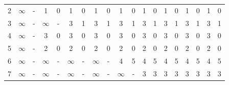 \documentclass[12pt, a4paper]{report}
\newtheorem[style=M,bodystyle=\normalfont]{theorem}{Theorem}
\newtheorem[style=M,bodystyle=\normalfont]{corollary}{Corollary}
\newtheorem[style=M,bodystyle=\normalfont]{lemma}{Lemma}
\newtheorem[style=M,bodystyle=\normalfont]{definition}{Definition}
\begin{document}
\begin{table}[H]
{\begin{tabular}{|c|cc|cc|cc|cc|cc|cc|cc|cc|cc|}
            2                              & $\infty$              & -                     & 1                     & 0                     & 1                     & 0                     & 1                     & 0                     & 1                     & 0                     & 1                     & 0                     & 1                     & 0                     & 1                     & 0                     & 1                     & 0                    \\
            3                              & $\infty$              & -                     & $\infty$              & -                     & 3                     & 1                     & 3                     & 1                     & 3                     & 1                     & 3                     & 1                     & 3                     & 1                     & 3                     & 1                     & 3                     & 1                    \\
            4                              & $\infty$              & -                     & 3                     & 0                     & 3                     & 0                     & 3                     & 0                     & 3                     & 0                     & 3                     & 0                     & 3                     & 0                     & 3                     & 0                     & 3                     & 0                    \\
            5                              & $\infty$              & -                     & 2                     & 0                     & 2                     & 0                     & 2                     & 0                     & 2                     & 0                     & 2                     & 0                     & 2                     & 0                     & 2                     & 0                     & 2                     & 0                    \\
            6                              & $\infty$              & -                     & $\infty$              & -                     & $\infty$              & -                     & $\infty$              & -                     & 4                     & 5                     & 4                     & 5                     & 4                     & 5                     & 4                     & 5                     & 4                     & 5                    \\
            7                              & $\infty$              & -                     & $\infty$              & -                     & $\infty$              & -                     & $\infty$              & -                     & $\infty$              & -                     & 3                     & 3                     & 3                     & 3                     & 3                     & 3                     & 3                     & 3                    \\ \hline
            \end{tabular}%
            }
        \end{table}
\end{document}
